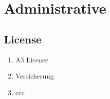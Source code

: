 
\chapter{Administrative}\label{chapter:Administrative}



\section{License}
\begin{enumerate}
    \item A3 Licence
    \item Versicherung
    \item ccc
  \end{enumerate}

